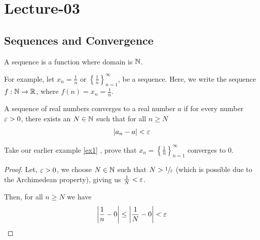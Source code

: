 \newpage
\section{Lecture-03}
\subsection{Sequences and Convergence}
\begin{definition}[Sequence]
	A sequence is a function where domain is $\mathbb{N}$.
\end{definition}
\begin{example}For example, let $x_n = \frac{1}{n} $ or $\left\{\frac{1}{n}\right\}_{n=1}^{\infty}$, be a sequence.
	Here, we write  the sequence $f: \mathbb{N} \rightarrow \mathbb{R}$, where $f(n) = x_n = \frac{1}{n}$.\label{ex1}
\end{example}
\begin{definition}
	A sequence of real numbers converges to a real number $a$ if for every number $\varepsilon> 0$, there exists an $N \in \mathbb{N}$ such that for all $n\ge N$ \[ |a_n-a| < \varepsilon \]
\end{definition}
\begin{example}
	Take our earlier example \ref{ex1} , prove that $x_n= \left\{\frac{1}{n}\right\}_{n=1}^{\infty}$ converges to $0$.
\end{example}
\begin{proof}
	Let, $\varepsilon > 0 $, we choose $N \in \mathbb{N}$ such that $N > \sfrac{1}{\varepsilon}$ (which is possible due to the Archimedean property), giving us $\frac{1}{N}<\varepsilon$.

	Then, for all $n\ge N$ we have
	\[\left| \dfrac{1}{n} - 0\right| \le \left|\dfrac{1}{N}-0\right| < \varepsilon\]
\end{proof}

